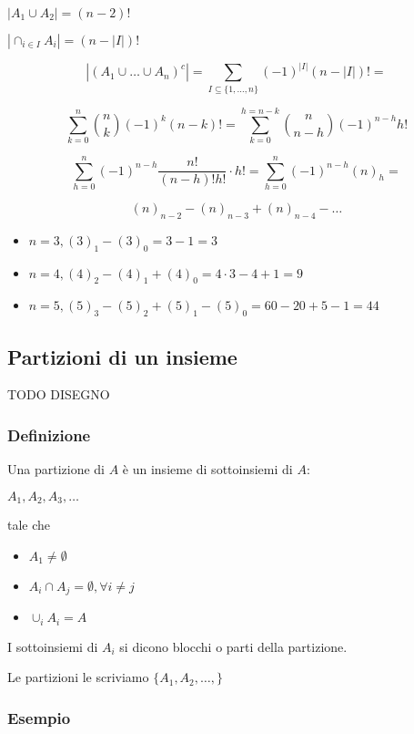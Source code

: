 \documentclass[11pt]{article}
\begin{document}
		$|A_1 \cup A_2| = (n-2)!$

		$|\cap_{i \in I} A_i| = (n-|I|)!$
		
	\[
		|(A_1 \cup \ldots \cup A_n)^{c}| = 
		\sum_{I \subseteq \{1,\ldots,n\}} (-1)^{|I|}(n-|I|)! =
	\]

	\[
		\sum_{k=0}^{n}\binom{n}{k}(-1)^{k}(n-k)! = 
		\sum_{k=0}^{h=n-k}\binom{n}{n-h}(-1)^{n-h}h!
	\]

	\[
		\sum_{h=0}^{n}(-1)^{n-h} \frac{n!}{(n-h)!h!} \cdot h! =
		\sum_{h=0}^{n}(-1)^{n-h}(n)_h =
	\]

	\[
		(n)_{n-2} - (n)_{n-3} + (n)_{n-4} - \ldots	
	\]
		\begin{itemize}
			\item $n=3 , (3)_1 - (3)_0 = 3 - 1 = 3$
			\item $n=4, (4)_2 - (4)_1 + (4)_0 = 4 \cdot 3 - 4 + 1 = 9$
			\item $n=5, (5)_3 - (5)_2 + (5)_1 - (5)_0 = 60 - 20 + 5 - 1 = 44$
		\end{itemize}
		
		\subsection{Partizioni di un insieme}

		TODO DISEGNO

		\subsubsection{Definizione}

		Una partizione di $A$ \`e un insieme di sottoinsiemi di $A$:

		$A_1,A_2,A_3,\ldots$

		tale che 

		\begin{itemize}
			\item $A_1 \neq \emptyset$
			\item $A_i \cap A_j = \emptyset, \forall i \neq j$
			\item $\cup_i A_i = A$
		\end{itemize}

		I sottoinsiemi di $A_i$ si dicono blocchi o parti della partizione.

		Le partizioni le scriviamo $\{A_1,A_2,\ldots,\}$

		\subsubsection{Esempio}
\end{document}
